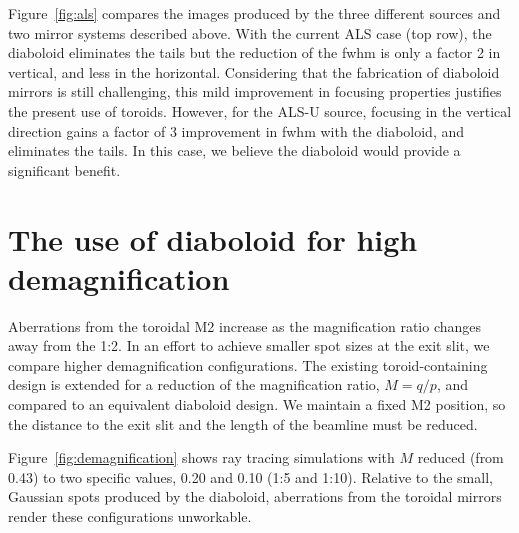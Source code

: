 \documentclass{iucr}       %
\begin{document}
Figure~\ref{fig:als} compares the images produced by the three different sources and two mirror systems described above. With the current ALS case (top row), the diaboloid eliminates the tails but the reduction of the fwhm is only a factor 2 in vertical, and less in the horizontal. Considering that the fabrication of diaboloid mirrors is still challenging, this mild improvement in focusing properties justifies the present use of toroids. However, for the ALS-U source, focusing in the vertical direction gains a factor of 3 improvement in fwhm with the diaboloid, and eliminates the tails. In this case, we believe the diaboloid would provide a significant benefit.

\section{The use of diaboloid for high demagnification}
\label{sec:scan}

Aberrations from the toroidal M2 increase as the magnification ratio changes away from the 1:2. In an effort to achieve smaller spot sizes at the exit slit, we compare higher demagnification configurations. The existing toroid-containing design is extended for a reduction of the magnification ratio, $M=q/p$, and compared to an equivalent diaboloid design. We maintain a fixed M2 position, so the distance to the exit slit and the length of the beamline must be reduced.

Figure~\ref{fig:demagnification} shows ray tracing simulations with $M$ reduced (from 0.43) to two specific values, 0.20 and 0.10 (1:5 and 1:10). Relative to the small, Gaussian spots produced by the diaboloid, aberrations from the toroidal mirrors render these configurations unworkable.
\end{document}
